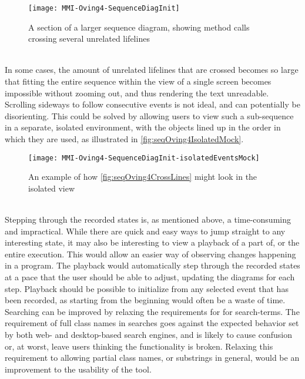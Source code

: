 \begin{figure}[H]
	\centering
	\texttt{[image: MMI-Oving4-SequenceDiagInit]}
	\caption{A section of a larger sequence diagram, showing method calls crossing several unrelated lifelines}
	\label{fig:seqOving4CrossLines}
\end{figure}
~\\

In some cases, the amount of unrelated lifelines that are crossed becomes so large that fitting the entire sequence within the view of a single screen becomes impossible without zooming out, and thus rendering the text unreadable.
Scrolling sideways to follow consecutive events is not ideal, and can potentially be disorienting.
This could be solved by allowing users to view such a sub-sequence in a separate, isolated environment, with the objects lined up in the order in which they are used, as illustrated in \autoref{fig:seqOving4IsolatedMock}.
~\\

\begin{figure}[H]
	\centering
	\texttt{[image: MMI-Oving4-SequenceDiagInit-isolatedEventsMock]}
	\caption{An example of how \autoref{fig:seqOving4CrossLines} might look in the isolated view}
	\label{fig:seqOving4IsolatedMock}
\end{figure}
~\\

Stepping through the recorded states is, as mentioned above, a time-consuming and impractical.
While there are quick and easy ways to jump straight to any interesting state, it may also be interesting to view a playback of a part of, or the entire execution.
This would allow an easier way of observing changes happening in a program.
The playback would automatically step through the recorded states at a pace that the user should be able to adjust, updating the diagrams for each step.
Playback should be possible to initialize from any selected event that has been recorded, as starting from the beginning would often be a waste of time.
~\\

Searching can be improved by relaxing the requirements for for search-terms.
The requirement of full class names in searches goes against the expected behavior set by both web- and desktop-based search engines, and is likely to cause confusion or, at worst, leave users thinking the functionality is broken.
Relaxing this requirement to allowing partial class names, or substrings in general, would be an improvement to the usability of the tool.
~\\
